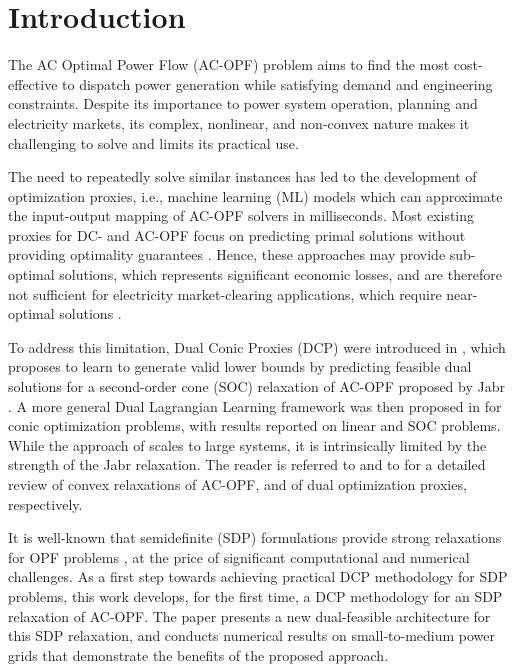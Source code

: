 \section{Introduction}
\label{sec:introduction}
The AC Optimal Power Flow (AC-OPF) problem aims to find the most cost-effective to dispatch power generation while satisfying demand and engineering constraints.
Despite its importance to power system operation, planning and electricity markets, its complex, nonlinear, and non-convex nature makes it challenging to solve and limits its practical use.

The need to repeatedly solve similar instances has led to the development of optimization proxies, i.e., machine learning (ML) models which can approximate the input-output mapping of AC-OPF solvers in milliseconds.
Most existing proxies for DC- and AC-OPF focus on predicting primal solutions without providing optimality guarantees \cite{fioretto2020predicting,donti2021dc3,huang2021deepopf,Chen2023_E2ELR}.
Hence, these approaches may provide sub-optimal solutions, which represents significant economic losses, and are therefore not sufficient for electricity market-clearing applications, which require near-optimal solutions \cite{MISO_BPM_002}.

To address this limitation, Dual Conic Proxies (DCP) were introduced in \cite{qiu2024dual}, which proposes to learn to generate valid lower bounds by predicting feasible dual solutions for a second-order cone (SOC) relaxation of AC-OPF proposed by Jabr \cite{Jabr2006_SOCRelaxationOPF}.
A more general Dual Lagrangian Learning framework was then proposed in   \cite{tanneau2024dual} for conic optimization problems, with results reported on linear and SOC problems.
While the approach of \cite{qiu2024dual} scales to large systems, it is intrinsically limited by the strength of the Jabr relaxation.
The reader is referred to \cite{Molzahn2019_OPF_survey} and to \cite{qiu2024dual,tanneau2024dual} for a detailed review of convex relaxations of AC-OPF, and of dual optimization proxies, respectively.

It is well-known that semidefinite (SDP) formulations provide strong relaxations for OPF problems \cite{kocuk2016strong,Molzahn2019_OPF_survey}, at the price of significant computational and numerical challenges.
As a first step towards achieving practical DCP methodology for SDP problems, this work develops, for the first time, a 
DCP methodology for an SDP relaxation of AC-OPF.
The paper presents a new dual-feasible architecture for this SDP relaxation, and conducts numerical results on small-to-medium power grids that demonstrate the benefits of the proposed approach.